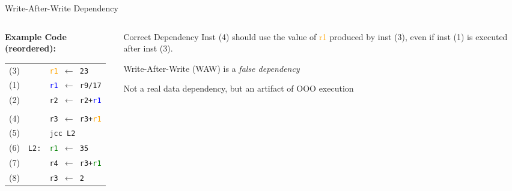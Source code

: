 \documentclass[aspectratio=169,12pt]{beamer}
\begin{document}
\begin{frame}{Write-After-Write Dependency}
  \begin{columns}
    \begin{column}{0.5\textwidth}
      \textbf{Example Code (reordered):} \\
      \begin{tabular}{lll}
        (3) & & \texttt{\textcolor{orange}{r1} $\leftarrow$ 23} \\
        (1) & & \texttt{\textcolor{blue}{r1} $\leftarrow$ r9/17} \\
        (2) & & \texttt{r2 $\leftarrow$ r2+\textcolor{blue}{r1}} \\
        & & \\
        (4) & & \texttt{r3 $\leftarrow$ r3+\textcolor{orange}{r1}} \\
        (5) & & \texttt{jcc L2} \\
        (6) & \texttt{L2:} & \texttt{\textcolor{green}{r1} $\leftarrow$ 35} \\
        (7) & & \texttt{r4 $\leftarrow$ r3+\textcolor{green}{r1}} \\
        (8) & & \texttt{r3 $\leftarrow$ 2} \\
      \end{tabular}
    \end{column}
    
    \begin{column}{0.5\textwidth}
      \begin{block}{Correct Dependency}
        Inst (4) should use the value of \textcolor{orange}{r1} produced by inst (3), even if inst (1) is executed after inst (3).
        
        \vspace{0.3cm}
        
        \alert{Write-After-Write (WAW) is a \emph{false dependency}}
        
        Not a real data dependency, but an artifact of OOO execution
      \end{block}
      
    \end{column}
  \end{columns}
\end{frame}
\end{document}
